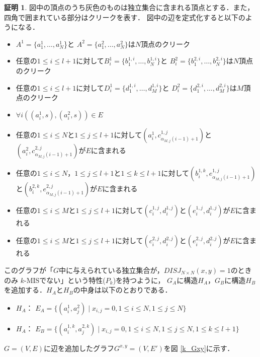 \documentclass[12pt]{thesis}
\theoremstyle{definition}
\newtheorem*{prf*}{証明}
\begin{document}
\begin{prf*}
図中の頂点のうち灰色のものは独立集合に含まれる頂点とする．また，四角で囲まれている部分はクリークを表す．
図中の辺を定式化すると以下のようになる．
\begin{itemize}
\item $A^{1}=\{a^{1}_{1},\dots,a^{1}_{N}$\}と
$A^{2}=\{a^{2}_{1},\dots,a^{2}_{N}\}$は$N$頂点のクリーク
\item 任意の$1\leq i \leq l+1$に対して$B^{1}_{i}=\{b^{1,i}_{1},\dots,b^{1,i}_{N}\}$と
$B^{2}_{i}=\{b^{2,i}_{1},\dots,b^{2,i}_{N}\}$は$N$頂点のクリーク
\item 任意の$1\leq i \leq l+1$に対して$D^{1}_{i}=\{d^{1,i}_{1},\dots,d^{1,i}_{M}\}$と
$D^{2}_{i}=\{d^{2,i}_{1},\dots,d^{2,i}_{M}\}$は$M$頂点のクリーク
\item $\forall i((a_{i}^{1}, s), (a_{i}^{2}, s)) \in E$
\item 任意の$1\leq i \leq N$と$1\leq j \leq l+1$に対して$\left(a^{1}_{i},c^{1,j}_{\alpha_{M,j}(i-1)+1}\right)$と$\left(a^{2}_{i},c^{2,j}_{\alpha_{M,j}(i-1)+1}\right)$が$E$に含まれる
\item 任意の$1\leq i \leq N$，$1\leq j \leq l+1$と$1\leq k \leq l+1$に対して$\left(b^{1,k}_{i},e^{1,j}_{\alpha_{M,j}(i-1)+1}\right)$と$\left(b^{2,k}_{i},e^{2,j}_{\alpha_{M,j}(i-1)+1}\right)$が$E$に含まれる
\item 任意の$1\leq i \leq M$と$1\leq j \leq l+1$に対して$(c_{i}^{1, j}, d_{i}^{1, j})$と$(e_{i}^{1, j}, d_{i}^{1, j})$が$E$に含まれる
\item 任意の$1\leq i \leq M$と$1\leq j \leq l+1$に対して$(c_{i}^{2, j}, d_{i}^{2, j})$と$(e_{i}^{2, j}, d_{i}^{2, j})$が$E$に含まれる
\end{itemize}

このグラフが「$G$中に与えられている独立集合が，$DISJ_{N \times N} (x, y) = 1$のときのみ
$k$-MISでない」という特性($P_{k}$)を持つように，
$G_{A}$に構造$H_{A}$，$G_{B}$に構造$H_{B}$を追加する．$H_{A}$と$H_{B}$の中身は以下のとおりである．

\begin{itemize}
\item $H_{A}$： $E_{A}=\{(a^{1}_{i},a^{2}_{j}) \mid x_{i,j}=0, 1 \leq i \leq N, 1 \leq j \leq N\}$
\item $H_{A}$： $E_{B}=\{(a^{1,k}_{i},a^{2,k}_{j}) \mid x_{i,j}=0, 1 \leq i \leq N, 1 \leq j \leq N, 1 \leq k \leq l+1\}$
\end{itemize}

$G = (V, E)$に辺を追加したグラフ$G^{x, y} = (V, E')$を図 \ref{k_Gxy}に示す．


\end{prf*}
\end{document}
